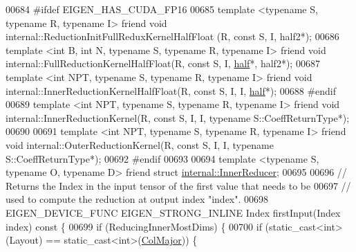 \begin{DoxyCode}
00684 \textcolor{preprocessor}{#ifdef EIGEN\_HAS\_CUDA\_FP16}
00685   \textcolor{keyword}{template} <\textcolor{keyword}{typename} S, \textcolor{keyword}{typename} R, \textcolor{keyword}{typename} I> \textcolor{keyword}{friend} \textcolor{keywordtype}{void} internal::ReductionInitFullReduxKernelHalfFloat
      (R, \textcolor{keyword}{const} S, I, half2*);
00686   \textcolor{keyword}{template} <\textcolor{keywordtype}{int} B, \textcolor{keywordtype}{int} N, \textcolor{keyword}{typename} S, \textcolor{keyword}{typename} R, \textcolor{keyword}{typename} I> \textcolor{keyword}{friend} \textcolor{keywordtype}{void} 
      internal::FullReductionKernelHalfFloat(R, \textcolor{keyword}{const} S, I, \hyperlink{struct_eigen_1_1half}{half}*, half2*);
00687   \textcolor{keyword}{template} <\textcolor{keywordtype}{int} NPT, \textcolor{keyword}{typename} S, \textcolor{keyword}{typename} R, \textcolor{keyword}{typename} I> \textcolor{keyword}{friend} \textcolor{keywordtype}{void} 
      internal::InnerReductionKernelHalfFloat(R, \textcolor{keyword}{const} S, I, I, \hyperlink{struct_eigen_1_1half}{half}*);
00688 \textcolor{preprocessor}{#endif}
00689   \textcolor{keyword}{template} <\textcolor{keywordtype}{int} NPT, \textcolor{keyword}{typename} S, \textcolor{keyword}{typename} R, \textcolor{keyword}{typename} I> \textcolor{keyword}{friend} \textcolor{keywordtype}{void} internal::InnerReductionKernel(R, \textcolor{keyword}{
      const} S, I, I, \textcolor{keyword}{typename} S::CoeffReturnType*);
00690 
00691   \textcolor{keyword}{template} <\textcolor{keywordtype}{int} NPT, \textcolor{keyword}{typename} S, \textcolor{keyword}{typename} R, \textcolor{keyword}{typename} I> \textcolor{keyword}{friend} \textcolor{keywordtype}{void} internal::OuterReductionKernel(R, \textcolor{keyword}{
      const} S, I, I, \textcolor{keyword}{typename} S::CoeffReturnType*);
00692 \textcolor{preprocessor}{#endif}
00693 
00694   \textcolor{keyword}{template} <\textcolor{keyword}{typename} S, \textcolor{keyword}{typename} O, \textcolor{keyword}{typename} D> \textcolor{keyword}{friend} \textcolor{keyword}{struct }
      \hyperlink{struct_eigen_1_1internal_1_1_inner_reducer}{internal::InnerReducer};
00695 
00696   \textcolor{comment}{// Returns the Index in the input tensor of the first value that needs to be}
00697   \textcolor{comment}{// used to compute the reduction at output index "index".}
00698   EIGEN\_DEVICE\_FUNC EIGEN\_STRONG\_INLINE Index firstInput(Index index)\textcolor{keyword}{ const }\{
00699     \textcolor{keywordflow}{if} (ReducingInnerMostDims) \{
00700       \textcolor{keywordflow}{if} (static\_cast<int>(Layout) == static\_cast<int>(\hyperlink{group__enums_ggaacded1a18ae58b0f554751f6cdf9eb13a0cbd4bdd0abcfc0224c5fcb5e4f6669a}{ColMajor})) \{

\end{DoxyCode}
